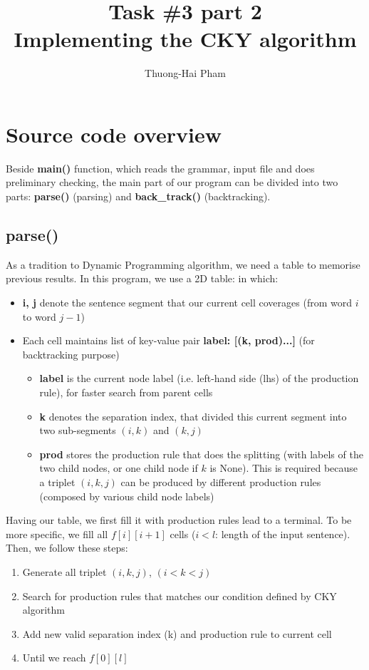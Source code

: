 \documentclass[12pt]{article}
\title{Task \#3 part 2\\Implementing the CKY algorithm}
\author{Thuong-Hai Pham}
\begin{document}
\maketitle

\section{Source code overview}
Beside \textbf{main()} function, which reads the grammar, input file and does preliminary checking, the main part of our program can be divided into two parts: \textbf{parse()} (parsing) and \textbf{back\_track()} (backtracking).

\subsection{parse()}
As a tradition to Dynamic Programming algorithm, we need a table to memorise previous results. In this program, we use a 2D table: 
in which:
\begin{itemize}
	\item \textbf{i, j} denote the sentence segment that our current cell coverages (from word $i$ to word $j-1$)
	\item Each cell maintains list of key-value pair \textbf{label: [(k, prod)...]} (for backtracking purpose)
	\begin{itemize}
		\item \textbf{label} is the current node label (i.e. left-hand side (lhs) of the production rule), for faster search from parent cells
		\item \textbf{k} denotes the separation index, that divided this current segment into two sub-segments $(i, k)$ and $(k, j)$
		\item \textbf{prod} stores the production rule that does the splitting (with labels of the two child nodes, or one child node if $k$ is None). This is required because a triplet $(i, k, j)$ can be produced by different production rules (composed by various child node labels)
	\end{itemize}
\end{itemize}

Having our table, we first fill it with production rules lead to a terminal. To be more specific, we fill all $f[i][i+1]$ cells ($i < l$: length of the input sentence). Then, we follow these steps:
\begin{enumerate}
	\item Generate all triplet $(i, k, j)$, $(i<k<j)$
	\item Search for production rules that matches our condition defined by CKY algorithm
	\item Add new valid separation index (k) and production rule to current cell
	\item Until we reach $f[0][l]$
\end{enumerate}
\end{document}
